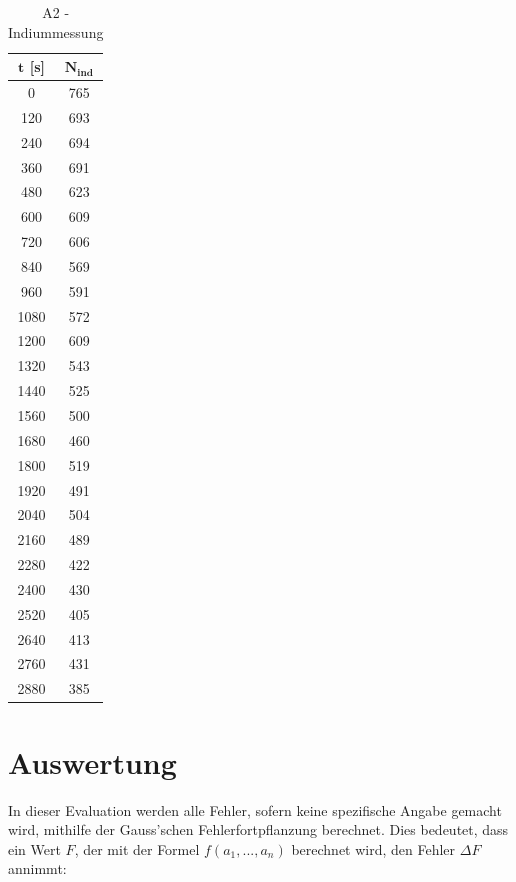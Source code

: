 \documentclass{article}
\begin{document}
\begin{table}[!p]
    \centering
    \begin{tabular}{cc}
        \hline
        $\bm{t}$ [s] & $\bm{N_{ind}}$  \\ \hline
        0 &    765 \\
      120 &    693 \\
      240 &    694 \\
      360 &    691 \\
      480 &    623 \\
      600 &    609 \\
      720 &    606 \\
      840 &    569 \\
      960 &    591 \\
     1080 &    572 \\
     1200 &    609 \\
     1320 &    543 \\
     1440 &    525 \\
     1560 &    500 \\
     1680 &    460 \\
     1800 &    519 \\
     1920 &    491 \\
     2040 &    504 \\
     2160 &    489 \\
     2280 &    422 \\
     2400 &    430 \\
     2520 &    405 \\
     2640 &    413 \\
     2760 &    431 \\
     2880 &    385 \\ \hline
    \end{tabular}%
    \caption{A2 - Indiummessung}
    \label{tab:A4-L1}
\end{table}


\clearpage
\newpage
\section{Auswertung}

In dieser Evaluation werden alle Fehler, sofern keine spezifische Angabe gemacht wird, mithilfe der Gauss'schen Fehlerfortpflanzung berechnet. Dies bedeutet, dass ein Wert $F$, der mit der Formel $f(a_1, ..., a_n)$ berechnet wird, den Fehler $\Delta F$ annimmt:
\end{document}
